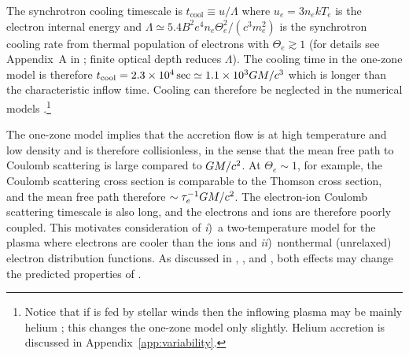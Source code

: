 The synchrotron cooling timescale is $t_\mathrm{cool} \equiv u/\Lambda$ where $u_e = 3 n_e k T_e$ is the electron internal energy and $\Lambda \simeq 5.4 B^2 e^4 n_e \Theta_e^2 /(c^3 m_e^2)$ is the synchrotron cooling rate from thermal population of electrons with $\Theta_e \gtrsim 1$ (for details see Appendix~A in \citealt{2011ApJ...735....9M}; finite optical depth reduces $\Lambda$).
The cooling time in the one-zone model is therefore $t_\mathrm{cool}=2.3 \times 10^4\,\mathrm{sec} \simeq 1.1 \times 10^3 GM/c^3$ which is longer than the characteristic inflow time.
Cooling can therefore be neglected in the numerical models \citep[e.g.,][]{2012MNRAS.426.1928D}.\footnote{Notice that if \sgra is fed by stellar winds then the inflowing plasma may be mainly helium \citep{2019MNRAS.482L.123R}; this changes the one-zone model only slightly.  Helium accretion is discussed  in Appendix~\ref{app:variability}.}

The one-zone model implies that the accretion flow is at high temperature and low density and is therefore collisionless, in the sense that the mean free path to Coulomb scattering is large compared to $GM/c^2$.
At $\Theta_e \sim 1$, for example, the Coulomb scattering cross section is comparable to the Thomson cross section, and the mean free path therefore $\sim \tau_e^{-1} GM/c^2$.
The electron-ion Coulomb scattering timescale is also long, and the electrons and ions are therefore poorly coupled.
This motivates consideration of
\emph{i})~a two-temperature model for the plasma where electrons are cooler than the ions \citep{1976ApJ...204..187S,1977ApJ...214..840I, 1982Natur.295...17R} and
\emph{ii})~nonthermal (unrelaxed) electron distribution functions.
As discussed in \citet{2000ApJ...541..234O}, \citet{2009ApJ...701..521C}, and \citet{2014A&A...570A...7M} \citep[see also more recent work by][]{2018A&A...612A..34D,2021arXiv211102518F, 2021NatAs.tmp..218C, 2021arXiv211203933E}, both effects may change the predicted properties of \sgra.

